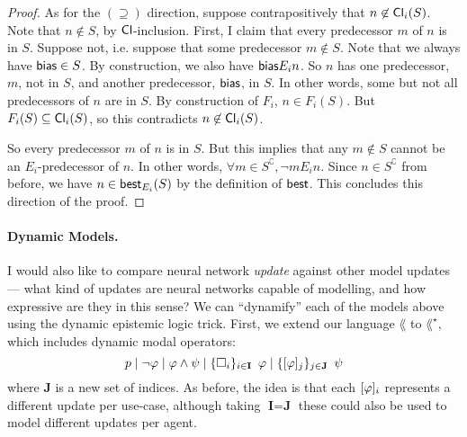\documentclass[letterpaper]{article}
\begin{document}
\begin{proof}
        As for the $(\supseteq)$ direction, suppose contrapositively that $n \not \in \mathsf{Cl}_i(S)$. Note that $n \not \in S$, by $\mathsf{Cl}$-inclusion.  First, I claim that every predecessor $m$ of $n$ is in $S$.  Suppose not, i.e. suppose that some predecessor $m \not \in S$.  Note that we always have $\mathsf{bias} \in S$.  By construction, we also have $\mathsf{bias}{E_i}n$.  So $n$ has one predecessor, $m$, not in $S$, and another predecessor, $\mathsf{bias}$, in $S$.  In other words, some but not all predecessors of $n$ are in $S$.  By construction of $F_i$, $n \in F_i(S)$.  But $F_i(S) \subseteq \mathsf{Cl}_i(S)$, so this contradicts $n \not \in \mathsf{Cl}_i(S)$.

        So every predecessor $m$ of $n$ is in $S$.  But this implies that any $m \not \in S$ cannot be an $E_i$-predecessor of $n$.  In other words, $\forall m \in S^\complement, \neg m{E_i}n$.  Since $n \in S^\complement$ from before, we have $n \in \mathsf{best}_{E_i}(S)$ by the definition of $\mathsf{best}$.  This concludes this direction of the proof.
    \end{proof}

    

\paragraph*{Dynamic Models.}

I would also like to compare neural network \emph{update} against other model updates --- what kind of updates are neural networks capable of modelling, and how expressive are they in this sense?  We can ``dynamify'' each of the models above using the dynamic epistemic logic trick.  First, we extend our language $\lang$ to $\lang^\star$, which includes dynamic modal operators:
\[
    p \mid \neg \varphi \mid \varphi \land \psi \mid \{ \Box_i \}_{i \in \textbf{I}} \hspace*{0.5em} \varphi \mid \{ [\varphi]_j \}_{j \in \textbf{J}} \hspace*{0.5em} \psi
\]
where \textbf{J} is a new set of indices.  As before, the idea is that each $[\varphi]_i$ represents a different update per use-case, although taking $\textbf{I} = \textbf{J}$ these could also be used to model different updates per agent.
\end{document}
